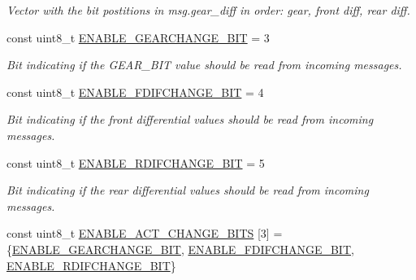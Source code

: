 \begin{DoxyCompactItemize}
\begin{DoxyCompactList}\small\item\em Vector with the bit postitions in msg.\+gear\+\_\+diff in order\+: gear, front diff, rear diff. \end{DoxyCompactList}\item 
const uint8\+\_\+t \hyperlink{group__MsgBitPositions_ga9f523412ec86e2d7c6ecd3c1a49a2d9b}{E\+N\+A\+B\+L\+E\+\_\+\+G\+E\+A\+R\+C\+H\+A\+N\+G\+E\+\_\+\+B\+IT} = 3\hypertarget{group__MsgBitPositions_ga9f523412ec86e2d7c6ecd3c1a49a2d9b}{}\label{group__MsgBitPositions_ga9f523412ec86e2d7c6ecd3c1a49a2d9b}

\begin{DoxyCompactList}\small\item\em Bit indicating if the G\+E\+A\+R\+\_\+\+B\+IT value should be read from incoming messages. \end{DoxyCompactList}\item 
const uint8\+\_\+t \hyperlink{group__MsgBitPositions_ga62390c182ca2894e4370302b2ee56ed9}{E\+N\+A\+B\+L\+E\+\_\+\+F\+D\+I\+F\+C\+H\+A\+N\+G\+E\+\_\+\+B\+IT} = 4\hypertarget{group__MsgBitPositions_ga62390c182ca2894e4370302b2ee56ed9}{}\label{group__MsgBitPositions_ga62390c182ca2894e4370302b2ee56ed9}

\begin{DoxyCompactList}\small\item\em Bit indicating if the front differential values should be read from incoming messages. \end{DoxyCompactList}\item 
const uint8\+\_\+t \hyperlink{group__MsgBitPositions_gabd2bfd09673f529363f995d6ea7a94fb}{E\+N\+A\+B\+L\+E\+\_\+\+R\+D\+I\+F\+C\+H\+A\+N\+G\+E\+\_\+\+B\+IT} = 5\hypertarget{group__MsgBitPositions_gabd2bfd09673f529363f995d6ea7a94fb}{}\label{group__MsgBitPositions_gabd2bfd09673f529363f995d6ea7a94fb}

\begin{DoxyCompactList}\small\item\em Bit indicating if the rear differential values should be read from incoming messages. \end{DoxyCompactList}\item 
const uint8\+\_\+t \hyperlink{group__MsgBitPositions_gafee1df3a4ab5fca7535d372d876036ea}{E\+N\+A\+B\+L\+E\+\_\+\+A\+C\+T\+\_\+\+C\+H\+A\+N\+G\+E\+\_\+\+B\+I\+TS} \mbox{[}3\mbox{]} = \{\hyperlink{group__MsgBitPositions_ga9f523412ec86e2d7c6ecd3c1a49a2d9b}{E\+N\+A\+B\+L\+E\+\_\+\+G\+E\+A\+R\+C\+H\+A\+N\+G\+E\+\_\+\+B\+IT}, \hyperlink{group__MsgBitPositions_ga62390c182ca2894e4370302b2ee56ed9}{E\+N\+A\+B\+L\+E\+\_\+\+F\+D\+I\+F\+C\+H\+A\+N\+G\+E\+\_\+\+B\+IT}, \hyperlink{group__MsgBitPositions_gabd2bfd09673f529363f995d6ea7a94fb}{E\+N\+A\+B\+L\+E\+\_\+\+R\+D\+I\+F\+C\+H\+A\+N\+G\+E\+\_\+\+B\+IT}\}\hypertarget{group__MsgBitPositions_gafee1df3a4ab5fca7535d372d876036ea}{}\label{group__MsgBitPositions_gafee1df3a4ab5fca7535d372d876036ea}


\end{DoxyCompactItemize}
